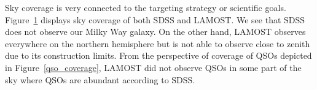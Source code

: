 Sky coverage is very connected to the targeting strategy or scientific goals.
Figure~\ref{sky_coverage} displays sky coverage of both SDSS and LAMOST.
We see that SDSS does not observe our Milky Way galaxy.
On the other hand, LAMOST observes everywhere on the northern hemisphere
but is not able to observe close to zenith due to its construction limits.
From the perspective of coverage of QSOs depicted in Figure~\ref{qso_coverage},
LAMOST did not observe QSOs in some part of the sky where QSOs are abundant according to SDSS.

\begin{figure}
\\
\caption[Sky coverage of SDSS and LAMOST]{}
\label{sky_coverage}
\end{figure}

